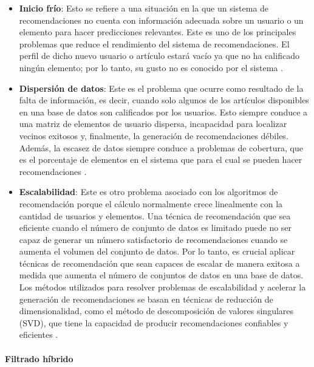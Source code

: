 \begin{itemize}
\item \textbf{Inicio frío}: Esto se refiere a una situación en la que un sistema de recomendaciones no cuenta con información adecuada sobre un usuario o un elemento para hacer predicciones relevantes. Este es uno de los principales problemas que reduce el rendimiento del sistema de recomendaciones. El perfil de dicho nuevo usuario o artículo estará vacío ya que no ha calificado ningún elemento; por lo tanto, su gusto no es conocido por el sistema \cite{Isinkaye}.

\item \textbf{Dispersión de datos}: Este es el problema que ocurre como resultado de la falta de información, es decir, cuando solo algunos de los artículos disponibles en una base de datos son calificados por los usuarios. Esto siempre conduce a una matriz de elementos de usuario dispersa, incapacidad para localizar vecinos exitosos y, finalmente, la generación de recomendaciones débiles. Además, la escasez de datos siempre conduce a problemas de cobertura, que es el porcentaje de elementos en el sistema que para el cual se pueden hacer recomendaciones \cite{Isinkaye}.

\item \textbf{Escalabilidad}: Este es otro problema asociado con los algoritmos de recomendación porque el cálculo normalmente crece linealmente con la cantidad de usuarios y elementos. Una técnica de recomendación que sea eficiente cuando el número de conjunto de datos es limitado puede no ser capaz de generar un número satisfactorio de recomendaciones cuando se aumenta el volumen del conjunto de datos. Por lo tanto, es crucial aplicar técnicas de recomendación que sean capaces de escalar de manera exitosa a medida que aumenta el número de conjuntos de datos en una base de datos. Los métodos utilizados para resolver problemas de escalabilidad y acelerar la generación de recomendaciones se basan en técnicas de reducción de dimensionalidad, como el método de descomposición de valores singulares (SVD), que tiene la capacidad de producir recomendaciones confiables y eficientes \cite{Isinkaye}. 

\end{itemize}
\paragraph{Filtrado híbrido} ~\\

